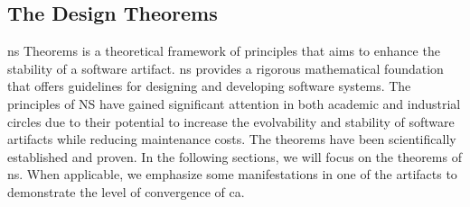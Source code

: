 \subsection{The Design Theorems} \label{subsec:ns_desing_theorems}

\gls{ns} Theorems is a theoretical framework of principles that aims to enhance the
stability of a software artifact. \gls{ns} provides a rigorous mathematical foundation
that offers guidelines for designing and developing software systems. The principles of NS
have gained significant attention in both academic and industrial circles due to their
potential to increase the evolvability and stability of software artifacts while reducing
maintenance costs. The theorems have been scientifically established and proven. In the
following sections, we will focus on the theorems of \gls{ns}. When applicable, we
emphasize some manifestations in one of the artifacts to demonstrate the level of
convergence of \gls{ca}.